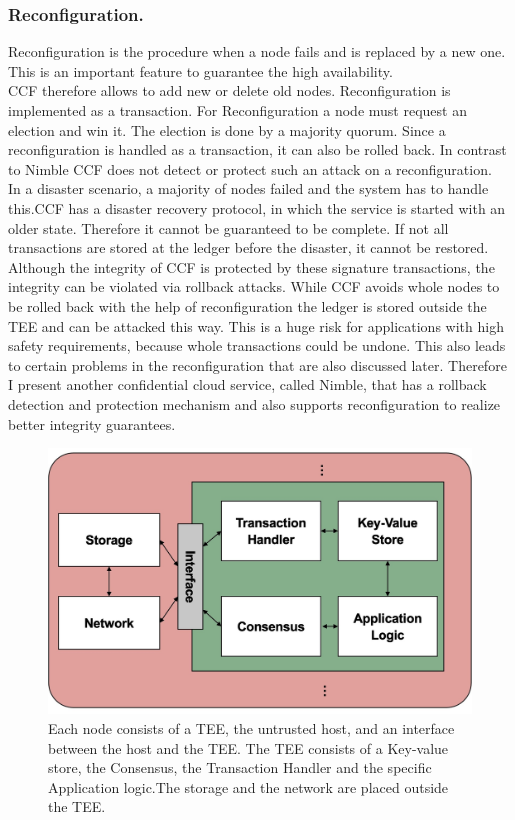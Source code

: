   \subsubsection*{Reconfiguration.}
  Reconfiguration is the procedure when a node fails and is replaced by a new one. This is an important feature to guarantee the high availability.\\
CCF therefore allows to add new or delete old nodes. Reconfiguration is implemented as a transaction. For Reconfiguration a node must request an election and win it. The election is done by a majority quorum. Since a reconfiguration is handled as a transaction, it can also be rolled back. In contrast to Nimble CCF does not detect or protect such an attack on a reconfiguration.\\%
In a disaster scenario, a majority of nodes failed and the system has to handle this.CCF has a disaster recovery protocol, in which the service is started with an older state. Therefore it cannot be guaranteed to be complete. If not all transactions are stored at the ledger before the disaster, it cannot be restored. \\
  Although the integrity of CCF is protected by these signature transactions, the integrity can be violated via rollback attacks. While CCF avoids whole nodes to be rolled back with the help of reconfiguration the ledger is stored outside the TEE and can be attacked this way. This is a huge risk for applications with high safety requirements, because whole transactions could be undone. This also leads to certain problems in the reconfiguration that are also discussed later. Therefore I present another confidential cloud service, called Nimble, that has a rollback detection and protection mechanism and also supports reconfiguration to realize better integrity guarantees.
 \begin{figure}[t]
	\includegraphics[scale=0.14]{pictures/ccf}
	\caption{Each node consists of a TEE, the untrusted host, and an interface between the host and the TEE. The TEE consists of a Key-value store, the Consensus, the Transaction Handler and the specific Application logic.The storage and the network are placed outside the TEE.}
	\label{ccf}
\end{figure}

